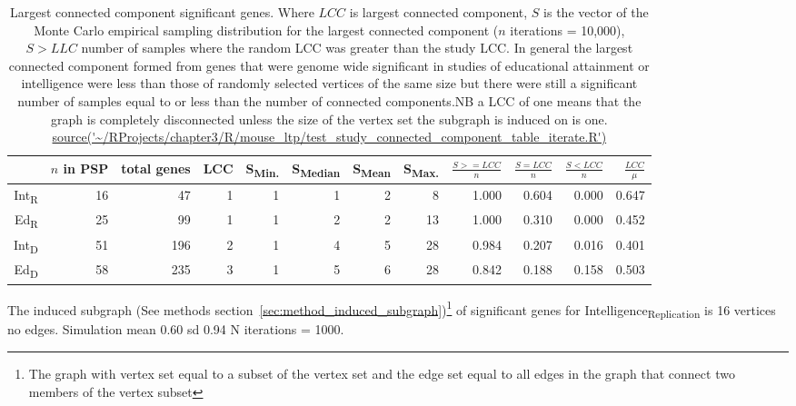 \begin{table}[ht]
\centering
\begin{adjustbox}{width=\textwidth}
\setlength{\extrarowheight}{2pt}
\begin{tabular}{rrrrrrrrrrrr}
  \toprule
 & $n$ in PSP & total genes & LCC & S\textsubscript{Min.} & S\textsubscript{Median} & S\textsubscript{Mean} & S\textsubscript{Max.} & $\frac{S>=LCC}{n}$ & $\frac{S=LCC}{n}$ & $\frac{S<LCC}{n}$ & $\frac{LCC}{\mu}$ \\ 
  \midrule
Int\textsubscript{R}  & 16 & 47 & 1 & 1 & 1 & 2 & 8 & 1.000 & 0.604 & 0.000 & 0.647 \\ 
  Ed\textsubscript{R}  & 25 & 99 & 1 & 1 & 2 & 2 & 13 & 1.000 & 0.310 & 0.000 & 0.452 \\ 
   Int\textsubscript{D} & 51 & 196 & 2 & 1 & 4 & 5 & 28 & 0.984 & 0.207 & 0.016 & 0.401 \\ 
  Ed\textsubscript{D}  & 58 & 235 & 3 & 1 & 5 & 6 & 28 & 0.842 & 0.188 & 0.158 & 0.503 \\ 
   \bottomrule
\end{tabular}
\end{adjustbox}
\caption[Largest connected component of significant genes]{Largest connected component significant genes. Where $LCC$ is largest connected component, $S$ is the vector of the Monte Carlo empirical sampling distribution for the largest connected component ($n$ iterations = 10,000), $S>LLC$ number of samples where the random LCC was greater than the study LCC. In general the largest connected component formed from genes that were genome wide significant in studies of educational attainment or intelligence were less than those of randomly selected vertices of the same size but there were still a significant number of samples equal to or less than the number of connected components.NB a LCC of one means that the graph is completely disconnected unless the size of the vertex set the subgraph is induced on is one. 
\tiny\url{source('~/RProjects/chapter3/R/mouse_ltp/test_study_connected_component_table_iterate.R')}}
\label{tab:Largest connected component significant genes}
\end{table}

The induced subgraph (See methods section~\ref{sec:method_induced_subgraph})\footnote{The graph with vertex set equal to a subset of the vertex set and the edge set equal to all edges in the graph that connect two members of the vertex subset} of significant genes for Intelligence\textsubscript{Replication} is 16 vertices no edges. Simulation mean 0.60 sd 0.94 N iterations = 1000.

